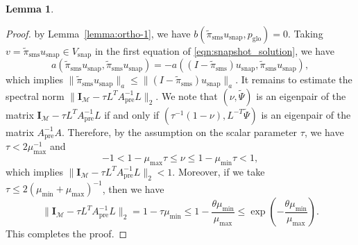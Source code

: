 \documentclass{article}[11pt]
\theoremstyle{definition}
\newtheorem{lemma}{Lemma}[section]
\begin{document}
\begin{lemma}
\begin{proof}
by Lemma~\ref{lemma:ortho-1}, we have $b(\tilde{\pi}_{\text{sms}} u_{\text{snap}}, p_{\text{glo}}) = 0$. 
Taking $v = \tilde{\pi}_{\text{sms}} u_{\text{snap}} \in V_{\text{snap}}$ in the first equation of \eqref{eqn:snapshot_solution}, we have 
\[ a(\tilde{\pi}_{\text{sms}} u_{\text{snap}}, \tilde{\pi}_{\text{sms}} u_{\text{snap}}) 
= -a((I-\tilde{\pi}_{\text{sms}}) u_{\text{snap}}, \tilde{\pi}_{\text{sms}} u_{\text{snap}}), \]
which implies $\| \tilde{\pi}_{\text{sms}} u_{\text{snap}} \|_a \leq \| (I - \tilde{\pi}_{\text{sms}}) u_{\text{snap}} \|_a$. 
It remains to estimate the spectral norm $\| \mathbf{I}_{\mathcal{M}} - \tau L^T A_{\text{pre}}^{-1} L \|_2$. 
We note that $(\nu, \tilde{\Psi})$ is an eigenpair of the matrix $\mathbf{I}_{\mathcal{M}} - \tau L^T A_{\text{pre}}^{-1} L$ 
if and only if $(\tau^{-1}(1- \nu), L^{-T} \tilde{\Psi})$ is an eigenpair of the matrix $A_{\text{pre}}^{-1} A$. 
Therefore, by the assumption on the scalar parameter $\tau$, we have  $\tau < 2\mu_{\text{max}}^{-1}$ and 
\[ -1 < 1 - \mu_{\text{max}} \tau \leq \nu \leq 1 - \mu_{\text{min}} \tau < 1, \] 
which implies $\| \mathbf{I}_{\mathcal{M}} - \tau L^T A_{\text{pre}}^{-1} L \|_2 < 1$. 
Moreover, if we take $\tau \leq 2(\mu_{\text{min}}+\mu_{\text{max}})^{-1}$, then we have 
\[ 
\| \mathbf{I}_{\mathcal{M}} - \tau L^T A_{\text{pre}}^{-1} L \|_2 
= 1 - \tau \mu_{\text{min}} 
\leq 1 - \dfrac{\theta\mu_{\text{min}}}{\mu_{\text{max}}} 
\leq \exp\left(- \dfrac{\theta \mu_{\text{min}}}{\mu_{\text{max}}} \right). 
\]
This completes the proof. 
\end{proof}
\end{lemma}
\end{document}
